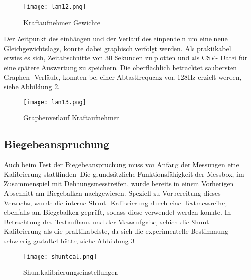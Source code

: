 \begin{figure}[htbp]
    \begin{center}
        \texttt{[image: lan12.png]}
        \caption[Kraftaufnehmer Gewichte (Abbildungsverzeichnis)]{Kraftaufnehmer Gewichte}
        
        \label{fig:lan12}
    \end{center}
\end{figure}

Der Zeitpunkt des einhängen und der Verlauf des einpendeln um eine neue Gleichgewichtslage, konnte dabei graphisch verfolgt werden.
Als praktikabel erwies es sich, Zeitabschnitte von 30 Sekunden zu plotten und als CSV- Datei für eine spätere Auswertung zu speichern.
Die oberflächlich betrachtet saubersten Graphen- Verläufe, konnten bei einer Abtastfrequenz von 128Hz erzielt werden, siehe Abbildung \ref{fig:lan13}.

\begin{figure}[htbp]
    \begin{center}
        \texttt{[image: lan13.png]}
        \caption[Graphenverlauf Kraftaufnehmer (Abbildungsverzeichnis)]{Graphenverlauf Kraftaufnehmer}
        
        \label{fig:lan13}
    \end{center}
\end{figure}

\subsection{Biegebeanspruchung}
Auch beim Test der Biegebeanspruchung muss vor Anfang der Messungen eine Kalibrierung stattfinden.
Die grundsätzliche Funktionsfähigkeit der Messbox, im Zusammenspiel mit Dehnungsmesstreifen, wurde bereits in einem Vorherigen Abschnitt am Biegebalken nachgewiesen.
Speziell zu Vorbereitung dieses Versuchs, wurde die interne Shunt- Kalibrierung durch eine Testmessreihe, ebenfalls am Biegebalken geprüft, sodass diese verwendet werden konnte.
In Betrachtung des Testaufbaus und der Messaufgabe, schien die Shunt- Kalibrierung als die praktikabelste, da sich die experimentelle Bestimmung schwierig gestaltet hätte, siehe Abbildung \ref{fig:shuntcal}. 
\begin{figure}[htbp]
    \begin{center}
        \texttt{[image: shuntcal.png]}
        \caption[Shuntkalibrierungseinstellungen (Abbildungsverzeichnis)]{Shuntkalibrierungseinstellungen}
        
        \label{fig:shuntcal}
    \end{center}
\end{figure}



